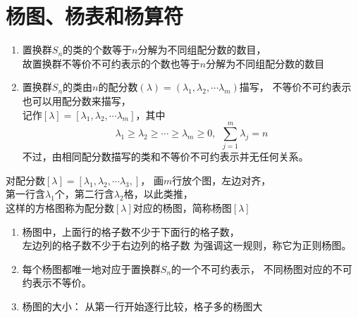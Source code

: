 \clearpage

\section{杨图、杨表和杨算符}

\begin{newlemma}[aa]
	\begin{enumerate}
		\item 
		置换群$S_n$的类的个数等于$n$分解为不同组配分数的数目，\\
		故置换群不等价不可约表示的个数也等于$n$分解为不同组配分数的数目
		\item 
		置换群$S_n$的类由$n$的配分数$(\lambda)=(\lambda_1,\lambda_2,\cdots \lambda_m)$描写，
		不等价不可约表示也可以用配分数来描写，\\
		记作$[\lambda]=[\lambda_1,\lambda_2,\cdots \lambda_m]$，其中
		\begin{equation}
			\lambda_1 \geq \lambda_2 \geq \cdots \geq \lambda_m \geq 0,~~\sum\limits_{j=1}^m\lambda_j=n
		\end{equation}
		不过，由相同配分数描写的类和不等价不可约表示并无任何关系。
	\end{enumerate}
\end{newlemma}

\begin{newdef}[杨图]
	对配分数$[\lambda]=[\lambda_1,\lambda_2,\cdots \lambda_3,]$，
	画$m$行放个图，{\color{seco}左边对齐}，\\
	第一行含$\lambda_1$个，第二行含$\lambda_2$格，以此类推，\\
	这样的方格图称为配分数$[\lambda]$对应的{\color{seco}杨图}，简称杨图$[\lambda]$
\end{newdef}


\begin{note}
	\begin{enumerate}
		\item 
		杨图中，上面行的格子数不少于下面行的格子数，\\
		左边列的格子数不少于右边列的格子数
		为强调这一规则，称它为{\color{seco}正则杨图}。
		\item 
		{\color{seco}每个杨图都唯一地对应于置换群$S_n$的一个不可约表示，
			不同杨图对应的不可约表示不等价。
		}
	
		\item 
		{\color{seco}杨图的大小}：
		从第一行开始逐行比较，格子多的杨图大
	\end{enumerate}
\end{note}



